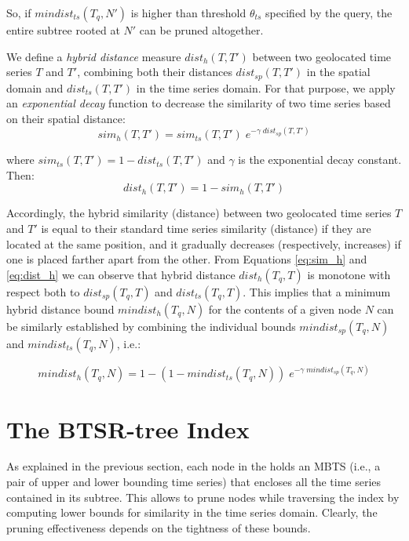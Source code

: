 \noindent So, if $mindist_{ts}(T_q, N')$ is higher than threshold $\theta_{ts}$ specified by the query, the entire subtree rooted at $N'$ can be pruned altogether.

We define a {\em hybrid distance} measure $dist_h(T, T')$ between two geolocated time series $T$ and $T'$, combining both their distances $dist_{sp}(T, T')$ in the spatial domain and $dist_{ts}(T, T')$ in the time series domain. For that purpose, we apply an {\em exponential decay} function to decrease the similarity of two time series based on their spatial distance:
\begin{equation}
 sim_h(T, T') = sim_{ts}(T, T') \; e^{- \gamma \; dist_{sp}(T, T')}
 \label{eq:sim_h}
\end{equation}

\noindent where $sim_{ts}(T, T') = 1 - dist_{ts}(T, T')$ and $\gamma$ is the exponential decay constant. Then:
\begin{equation}
 dist_h(T, T') = 1 - sim_h(T, T')
 \label{eq:dist_h}
\end{equation}

Accordingly, the hybrid similarity (distance) between two geolocated time series $T$ and $T'$ is equal to their standard time series similarity (distance) if they are located at the same position, and it gradually decreases (respectively, increases) if one is placed farther apart from the other. From Equations \ref{eq:sim_h} and \ref{eq:dist_h} we can observe that hybrid distance $dist_h(T_q, T)$ is monotone with respect both to $dist_{sp}(T_q, T)$ and $dist_{ts}(T_q, T)$. This implies that a minimum hybrid distance bound $mindist_h(T_q, N)$ for the contents of a given node $N$ can be similarly established by combining the individual bounds $mindist_{sp}(T_q, N)$ and $mindist_{ts}(T_q, N)$, i.e.:

\begin{equation}
mindist_h(T_q, N) = 1 - (1 - mindist_{ts}(T_q, N)) \; e^{- \gamma \; mindist_{sp}(T_q, N)}
\end{equation}

\section{The BTSR-tree Index}
\label{sec:ctsrtree}

As explained in the previous section, each node in the \tsr holds an MBTS (i.e., a pair of upper and lower bounding time series) that encloses all the time series contained in its subtree. This allows to prune nodes while traversing the index by computing lower bounds for similarity in the time series domain. Clearly, the pruning effectiveness depends on the tightness of these bounds.

